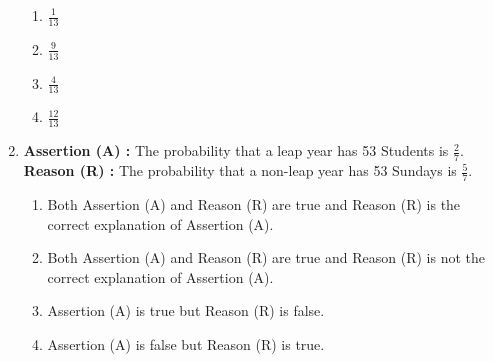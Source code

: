 \documentclass{article}
\begin{document}
\begin{enumerate}
			\begin{enumerate}
				\item $ \frac {1} {13} $
				\item $ \frac {9} {13} $
				\item $ \frac {4} {13} $
				\item $ \frac {12} {13} $
			\end{enumerate}
	\item \textbf{Assertion (A) : } The probability that a leap year has 53 Students is $ \frac {2} {7} $.\\
		\textbf{Reason (R) : } The probability that a non-leap year has 53 Sundays is $ \frac {5} {7} $.
		
			  \begin{enumerate}
				  \item Both Assertion (A) and Reason (R) are true and Reason (R) is the correct explanation of Assertion (A).
				  \item Both Assertion (A) and Reason (R) are true and Reason (R) is not the correct explanation of Assertion (A).
				  \item Assertion (A) is true but Reason (R) is false.
				  \item Assertion (A) is false but Reason (R) is true.
			  \end{enumerate}
		

\end{enumerate}
\end{document}
